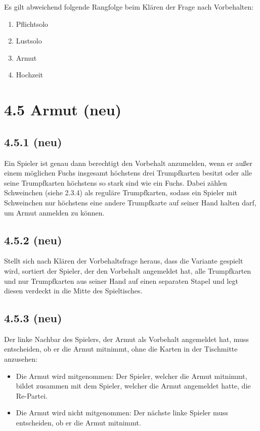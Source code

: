 Es gilt abweichend folgende Rangfolge beim Klären der Frage nach
Vorbehalten:

\begin{enumerate}
    \item Pflichtsolo
    \item Lustsolo
    \item Armut
    \item Hochzeit
\end{enumerate}

\section*{4.5 Armut (neu)}

\subsection*{4.5.1 (neu)}
 Ein Spieler ist genau dann berechtigt den Vorbehalt 
anzumelden, wenn er außer einem möglichen Fuchs insgesamt höchstens
drei Trumpfkarten besitzt oder alle seine Trumpfkarten höchstens so
stark sind wie ein Fuchs. Dabei zählen Schweinchen (siehe 2.3.4) als
reguläre Trumpfkarten, sodass ein Spieler mit Schweinchen nur
höchstens eine andere Trumpfkarte auf seiner Hand halten darf, um Armut
anmelden zu können.

\subsection*{4.5.2 (neu)}

Stellt sich nach Klären der Vorbehaltsfrage heraus, dass die Variante
 gespielt wird, sortiert der Spieler, der den Vorbehalt
angemeldet hat, alle Trumpfkarten und nur Trumpfkarten aus seiner Hand
auf einen separaten Stapel und legt diesen verdeckt in die Mitte des
Spieltisches.

\subsection*{4.5.3 (neu)}

Der linke Nachbar des Spielers, der Armut als Vorbehalt angemeldet hat,
muss entscheiden, ob er die Armut mitnimmt, ohne die Karten in der
Tischmitte anzusehen:

\begin{itemize}
    \item Die Armut wird mitgenommen: Der Spieler, welcher die Armut
        mitnimmt, bildet zusammen mit dem Spieler, welcher die Armut
        angemeldet hatte, die Re-Partei.
    \item Die Armut wird nicht mitgenommen: Der nächste linke Spieler
        muss entscheiden, ob er die Armut mitnimmt.
\end{itemize}

